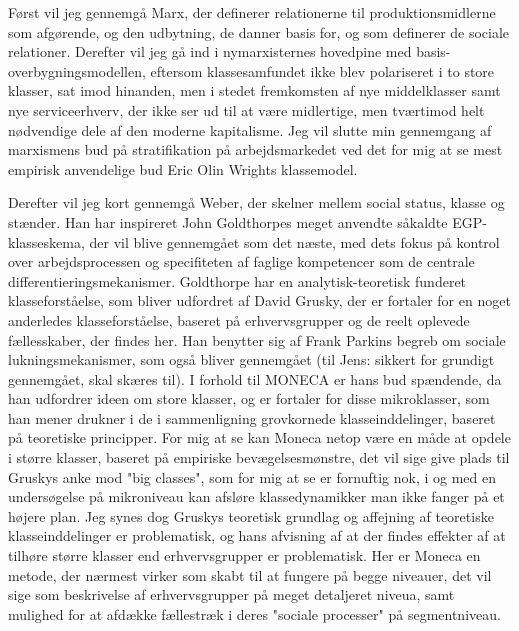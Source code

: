 Først vil jeg gennemgå Marx, der definerer relationerne til produktionsmidlerne som afgørende, og den udbytning, de danner basis for, og som definerer de sociale relationer. Derefter vil jeg gå ind i nymarxisternes hovedpine med basis-overbygningsmodellen, eftersom klassesamfundet ikke blev polariseret i to store klasser, sat imod hinanden, men i stedet fremkomsten af nye middelklasser samt nye serviceerhverv, der ikke ser ud til at være midlertige, men tværtimod helt nødvendige dele af den moderne kapitalisme. Jeg vil slutte min gennemgang af marxismens bud på stratifikation på arbejdsmarkedet ved det for mig at se mest empirisk anvendelige bud Eric Olin Wrights klassemodel.

Derefter vil jeg kort gennemgå Weber, der skelner mellem social status, klasse og stænder. Han har inspireret John Goldthorpes meget anvendte såkaldte EGP-klasseskema, der vil blive gennemgået som det næste, med dets fokus på kontrol over arbejdsprocessen og specifiteten af faglige kompetencer som de centrale differentieringsmekanismer. Goldthorpe har en analytisk-teoretisk funderet klasseforståelse, som bliver udfordret af David Grusky, der er fortaler for en noget anderledes klasseforståelse, baseret på erhvervsgrupper og de reelt oplevede fællesskaber, der findes her. Han benytter sig af Frank Parkins begreb om sociale lukningsmekanismer, som også bliver gennemgået (til Jens: sikkert for grundigt gennemgået, skal skæres til). I forhold til MONECA er hans bud spændende, da han udfordrer ideen om store klasser, og er fortaler for disse mikroklasser, som han mener drukner i de i sammenligning grovkornede klasseinddelinger, baseret på teoretiske principper. For mig at se kan Moneca netop være en måde at opdele i større klasser, baseret på empiriske bevægelsesmønstre, det vil sige give plads til Gruskys anke mod "big classes", som for mig at se er fornuftig nok, i og med en undersøgelse på mikroniveau kan afsløre klassedynamikker man ikke fanger på et højere plan. Jeg synes dog Gruskys teoretisk grundlag og affejning af teoretiske klasseinddelinger er problematisk, og hans afvisning af at der findes effekter af at tilhøre større klasser end erhvervsgrupper er problematisk. Her er Moneca en metode, der nærmest virker som skabt til at fungere på begge niveauer, det vil sige som beskrivelse af erhvervsgrupper på meget detaljeret niveua, samt mulighed for at afdække fællestræk i deres "sociale processer" på segmentniveau.




